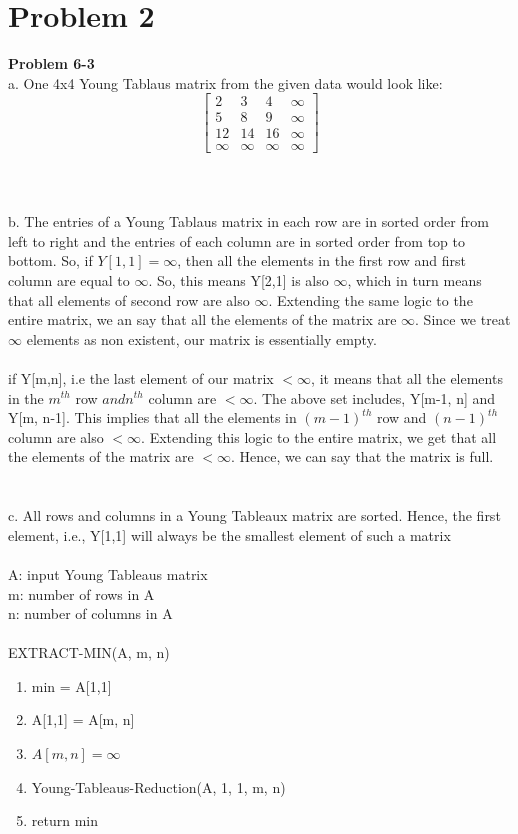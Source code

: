 \documentclass[10pt]{article}
\begin{document}
\section{Problem 2}
\textbf{Problem 6-3}\\
a. One 4x4 Young Tablaus matrix from the given data would look like:
\[
	\begin{bmatrix}
		2 & 3 & 4 & \infty\\
		5 & 8 & 9 & \infty\\
		12 & 14 & 16 & \infty\\
		\infty & \infty & \infty & \infty
	\end{bmatrix}		
\]\\\\\\
b. The entries of a Young Tablaus matrix in each row are in sorted order from left to right and the entries of each column are in sorted order from top to bottom. So, if $Y[1,1] = \infty$, then all the elements in the first row and first column are equal to $\infty$. So, this means Y[2,1] is also $\infty$, which in turn means that all elements of second row are also $\infty$. Extending the same logic to the entire matrix, we an say that all the elements of the matrix are $\infty$. Since we treat $\infty$ elements as non existent, our matrix is essentially empty.\\\\
if Y[m,n], i.e the last element of our matrix $ < \infty$, it means that all the elements in the $m^{th}$ row $and n^{th}$ column are $< \infty$. The above set includes, Y[m-1, n] and Y[m, n-1]. This implies that all the elements in $(m-1)^{th}$ row and $(n-1)^{th}$ column are also $< \infty$. Extending this logic to the entire matrix, we get that all the elements of the matrix are $< \infty$. Hence, we can say that the matrix is full.\\\\\\
c. All rows and columns in a Young Tableaux matrix are sorted. Hence, the first element, i.e., Y[1,1] will always be the smallest element of such a matrix\\\\
A: input Young Tableaus matrix\\
m: number of rows in A\\
n: number of columns in A\\\\
EXTRACT-MIN(A, m, n)
\begin{enumerate}
\item min = A[1,1]
\item A[1,1] = A[m, n]
\item $A[m, n] = \infty$
\item Young-Tableaus-Reduction(A, 1, 1, m, n)
\item return min\\
\end{enumerate}
\end{document}
